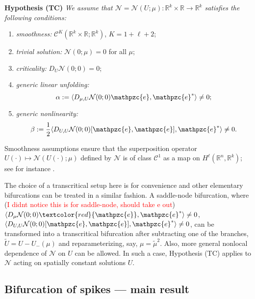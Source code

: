 \documentclass[10pt]{article}
\newenvironment{Hypothesis}[1]%
  {\begin{trivlist}\item[]{\bf Hypothesis #1 }\em}{\end{trivlist}}
\newcommand{\R}{\mathbb{R}}
\newcommand{\Nl}{\mathcal{N}}
\newcommand{\e}{\mathpzc{e}}
\begin{document}
\begin{Hypothesis} {(TC)} We assume that $\Nl=\Nl(U;\mu):\R^k \times \R \to \R^k $ satisfies the following conditions:
\begin{enumerate}
\item 
\emph{smoothness: }
$\mathscr{C}^{K}(\R^k \times \R; \R^k)$, $K=1+\ell+2$;
\item \emph{trivial solution: } $\Nl(0;\mu) = 0$ for all $\mu$;
\item \emph{criticality:} $D_U\Nl(0;0)=0$;
\item \emph{generic linear unfolding:  }
\begin{equation}
\alpha := \langle D_{\mu,U} \Nl(0;0){\e}, {\e}^*\rangle \neq 0; \label{muvCoe}\end{equation}
\item \emph{generic nonlinearity: } 
\begin{equation}
\beta := \frac{1}{2}\langle D_{U,U} \Nl(0;0)[{\e},{\e}], {\e}^*\rangle \neq 0.  \label{QuadCoe}
\end{equation}
\end{enumerate}
\end{Hypothesis}

Smoothness assumptions ensure that the superposition operator $U(\cdot) \mapsto \Nl(U(\cdot);\mu)$ defined by $\Nl$ is of class $\mathscr{C}^1$ as a map on $H^\ell(\R^n,\R^k)$; see for instance \cite{runst1996sobolev}.

The choice of a transcritical setup here is for convenience and other elementary bifurcations can be treated in a similar fashion. A saddle-node bifurcation, where (\textcolor{red}{I didnt notice this is for saddle-node, should take e out}) $\langle D_{\mu} \Nl(0;0)\textcolor{red}{\e}, {\e}^*\rangle \neq 0$,  $\langle D_{U,U} \Nl(0;0)[{\e},{\e}], {\e}^*\rangle \neq 0$, can be transformed into a transcritical bifurcation after subtracting one of the branches, $\tilde{U}=U-U_-(\mu)$ and reparameterizing, say, $\mu=\tilde{\mu}^2$. Also, more general nonlocal dependence of $\Nl$ on $U$ can be allowed. In such a case, Hypothesis (TC) applies to $\Nl$ acting on spatially constant solutions $U$.


\subsection{Bifurcation of spikes --- main result}\label{s:res}
\end{document}
